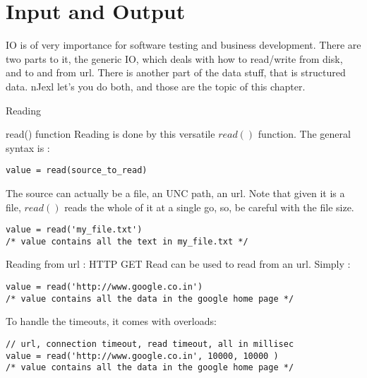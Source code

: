 \chapter{Input and Output}\label{input-output}

{\LARGE IO} is of very importance for software testing
and business development. There are two parts to it, the generic IO, 
which deals with how to read/write from disk, and to and from url.
There is another part of the data stuff, that is structured data.
nJexl let's you do both, and those are the topic of this chapter.

\begin{section}{Reading}

\begin{subsection}{read() function}
Reading is done by this versatile $read()$ function.
The general syntax is :
\begin{lstlisting}[style=JexlStyle]
value = read(source_to_read)
\end{lstlisting}
The source can actually be a file, an UNC path, an url.
Note that given it is a file, $read()$ reads the whole 
of it at a single go, so, be careful with the file size. 

\begin{lstlisting}[style=JexlStyle]
value = read('my_file.txt')
/* value contains all the text in my_file.txt */
\end{lstlisting}
\end{subsection}

\begin{subsection}{Reading from url : HTTP GET}
Read can be used to read from an url.
Simply :

\begin{lstlisting}[style=JexlStyle]
value = read('http://www.google.co.in')
/* value contains all the data in the google home page */
\end{lstlisting}

To handle the timeouts, it comes with overloads:
\begin{center}\begin{minipage}{\linewidth}
\begin{lstlisting}[style=JexlStyle]
// url, connection timeout, read timeout, all in millisec
value = read('http://www.google.co.in', 10000, 10000 )
/* value contains all the data in the google home page */
\end{lstlisting}
\end{minipage}\end{center}


\end{subsection}
\end{section}
